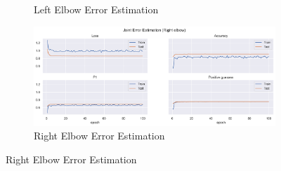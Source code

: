 \begin{figure}[!ht]
\begin{subfigure}[b]{0.47\linewidth}
      \caption{Left Elbow Error Estimation}
      \label{fig:v1_leel_jt_ee}
  \end{subfigure}
  \hfill
  \begin{subfigure}[b]{0.47\linewidth}
      \centering
      \includegraphics[width=\textwidth]{figures/Results/v1_bs_60_is_64_e_100/jt/Right elbow_ErrorEstimation.png}
      \caption{Right Elbow Error Estimation}
      \label{fig:v1_reel_jt_ee}
  \end{subfigure}
\end{figure}



